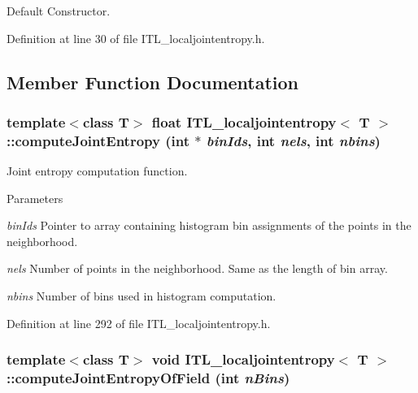 Default Constructor. 



Definition at line 30 of file ITL\_\-localjointentropy.h.



\subsection{Member Function Documentation}
\hypertarget{classITL__localjointentropy_a55d22392f68f774dc49ba7ee1d63f5e4}{
\subsubsection[{computeJointEntropy}]{\setlength{\rightskip}{0pt plus 5cm}template$<$class T$>$ float {\bf ITL\_\-localjointentropy}$<$ T $>$::computeJointEntropy (int $\ast$ {\em binIds}, \/  int {\em nels}, \/  int {\em nbins})}}
\label{classITL__localjointentropy_a55d22392f68f774dc49ba7ee1d63f5e4}


Joint entropy computation function. 


\begin{DoxyParams}{Parameters}
\item[{\em binIds}]Pointer to array containing histogram bin assignments of the points in the neighborhood. \item[{\em nels}]Number of points in the neighborhood. Same as the length of bin array. \item[{\em nbins}]Number of bins used in histogram computation. \end{DoxyParams}


Definition at line 292 of file ITL\_\-localjointentropy.h.

\hypertarget{classITL__localjointentropy_a61e8069fb43ede8ff287ec52b7ac3209}{
\subsubsection[{computeJointEntropyOfField}]{\setlength{\rightskip}{0pt plus 5cm}template$<$class T$>$ void {\bf ITL\_\-localjointentropy}$<$ T $>$::computeJointEntropyOfField (int {\em nBins})}}
\label{classITL__localjointentropy_a61e8069fb43ede8ff287ec52b7ac3209}


